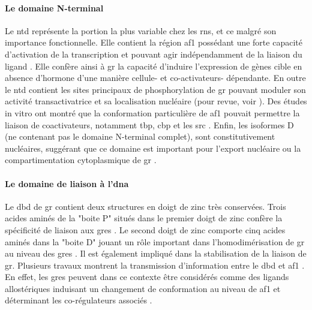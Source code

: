 \documentclass[../main.tex]{subfiles}
\begin{document}


\paragraph{Le domaine N-terminal}
Le \gls{ntd} représente la portion la plus variable chez les \glspl{rn}, et ce malgré son importance fonctionnelle.
Elle contient la région \gls{af1} possédant une forte capacité d'activation de la transcription et pouvant agir indépendamment de la liaison du ligand \citep{Godowski1987}.
Elle confère ainsi à \gls{gr} la capacité d'induire l'expression de gènes cible en absence d'hormone d'une manière cellule- et co-activateurs- dépendante.
En outre le \gls{ntd} contient les sites principaux de phosphorylation de \gls{gr} pouvant moduler son activité transactivatrice et sa localisation nucléaire (pour revue, voir \citealp{Galliher-Beckley2009}).
Des études in vitro ont montré que la conformation particulière de \gls{af1} pouvait permettre la liaison de coactivateurs, notamment \gls{tbp}, \gls{cbp} et les \gls{src} \citep{Kumar2005}.
Enfin, les isoformes D (ne contenant pas le domaine N-terminal complet), sont constitutivement nucléaires, suggérant que ce domaine est important pour l'export nucléaire ou la compartimentation cytoplasmique de \gls{gr} \citep{Lu2006}.

\paragraph{Le domaine de liaison à l'\gls{dna}}
Le \gls{dbd} de \gls{gr} contient deux structures en doigt de zinc très conservées.
Trois acides aminés de la "boite P" situés dans le premier doigt de zinc confère la spécificité de liaison aux \glspl{gre} \citep{Luisi1991}.
Le second doigt de zinc comporte cinq acides aminés dans la "boite D" jouant un rôle important dans l'homodimérisation de \gls{gr} au niveau des \glspl{gre} \citep{Luisi1991}.
Il est également impliqué dans la stabilisation de la liaison de \gls{gr}.
Plusieurs travaux montrent la transmission d'information entre le \gls{dbd} et \gls{af1} \citep{Kumar1999}.
En effet, les \glspl{gre} peuvent dans ce contexte être considérés comme des ligands allostériques induisant un changement de conformation au niveau de \gls{af1} et déterminant les co-régulateurs associés \citep{Lefstin1998}.
\end{document}
